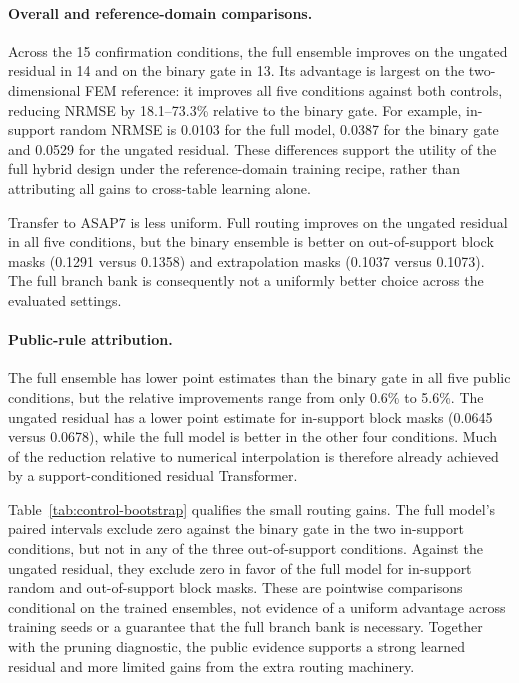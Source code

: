 \paragraph{Overall and reference-domain comparisons.}
Across the 15 confirmation conditions, the full ensemble improves on the
ungated residual in 14 and on the binary gate in 13. Its advantage is largest
on the two-dimensional FEM reference: it improves all five conditions against
both controls, reducing NRMSE by 18.1--73.3\% relative to the binary gate.
For example, in-support random NRMSE is 0.0103 for the full model, 0.0387 for
the binary gate and 0.0529 for the ungated residual. These differences support
the utility of the full hybrid design under the reference-domain training
recipe, rather than attributing all gains to cross-table learning alone.

Transfer to ASAP7 is less uniform. Full routing improves on the ungated
residual in all five conditions, but the binary ensemble is better on
out-of-support block masks (0.1291 versus 0.1358) and extrapolation masks
(0.1037 versus 0.1073). The full branch bank is consequently not a uniformly
better choice across the evaluated settings.

\paragraph{Public-rule attribution.}
The full ensemble has lower point estimates than the binary gate in all five
public conditions, but the relative improvements range from only 0.6\% to
5.6\%. The ungated residual has a lower point estimate for in-support block masks
(0.0645 versus 0.0678), while the full model is better in the other four
conditions. Much of the reduction relative to numerical interpolation is
therefore already achieved by a support-conditioned residual Transformer.

Table~\ref{tab:control-bootstrap} qualifies the small routing gains. The full
model's paired intervals exclude zero against the binary gate in the two
in-support conditions, but not in any of the three out-of-support conditions.
Against the ungated residual, they exclude zero in favor of the full model
for in-support random and out-of-support block masks. These are pointwise
comparisons conditional on the trained ensembles, not evidence of a uniform
advantage across training seeds or a guarantee that the full branch bank is
necessary. Together with the pruning diagnostic, the public evidence supports
a strong learned residual and more limited gains from the extra routing machinery.

